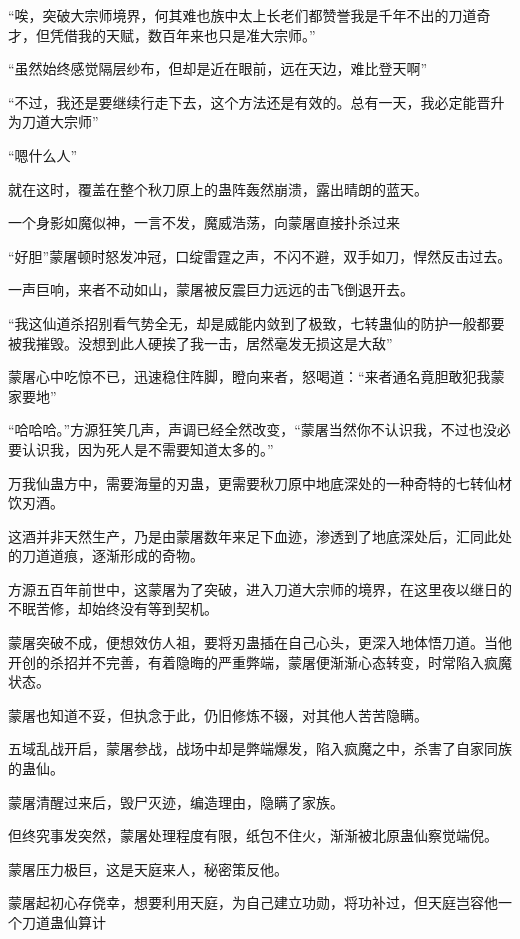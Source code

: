 \begin{this_body}
“唉，突破大宗师境界，何其难也族中太上长老们都赞誉我是千年不出的刀道奇才，但凭借我的天赋，数百年来也只是准大宗师。”

“虽然始终感觉隔层纱布，但却是近在眼前，远在天边，难比登天啊”

“不过，我还是要继续行走下去，这个方法还是有效的。总有一天，我必定能晋升为刀道大宗师”

“嗯什么人”

就在这时，覆盖在整个秋刀原上的蛊阵轰然崩溃，露出晴朗的蓝天。

一个身影如魔似神，一言不发，魔威浩荡，向蒙屠直接扑杀过来

“好胆”蒙屠顿时怒发冲冠，口绽雷霆之声，不闪不避，双手如刀，悍然反击过去。

一声巨响，来者不动如山，蒙屠被反震巨力远远的击飞倒退开去。

“我这仙道杀招别看气势全无，却是威能内敛到了极致，七转蛊仙的防护一般都要被我摧毁。没想到此人硬挨了我一击，居然毫发无损这是大敌”

蒙屠心中吃惊不已，迅速稳住阵脚，瞪向来者，怒喝道：“来者通名竟胆敢犯我蒙家要地”

“哈哈哈。”方源狂笑几声，声调已经全然改变，“蒙屠当然你不认识我，不过也没必要认识我，因为死人是不需要知道太多的。”

万我仙蛊方中，需要海量的刃蛊，更需要秋刀原中地底深处的一种奇特的七转仙材饮刃酒。

这酒并非天然生产，乃是由蒙屠数年来足下血迹，渗透到了地底深处后，汇同此处的刀道道痕，逐渐形成的奇物。

方源五百年前世中，这蒙屠为了突破，进入刀道大宗师的境界，在这里夜以继日的不眠苦修，却始终没有等到契机。

蒙屠突破不成，便想效仿人祖，要将刃蛊插在自己心头，更深入地体悟刀道。当他开创的杀招并不完善，有着隐晦的严重弊端，蒙屠便渐渐心态转变，时常陷入疯魔状态。

蒙屠也知道不妥，但执念于此，仍旧修炼不辍，对其他人苦苦隐瞒。

五域乱战开启，蒙屠参战，战场中却是弊端爆发，陷入疯魔之中，杀害了自家同族的蛊仙。

蒙屠清醒过来后，毁尸灭迹，编造理由，隐瞒了家族。

但终究事发突然，蒙屠处理程度有限，纸包不住火，渐渐被北原蛊仙察觉端倪。

蒙屠压力极巨，这是天庭来人，秘密策反他。

蒙屠起初心存侥幸，想要利用天庭，为自己建立功勋，将功补过，但天庭岂容他一个刀道蛊仙算计


\end{this_body}
